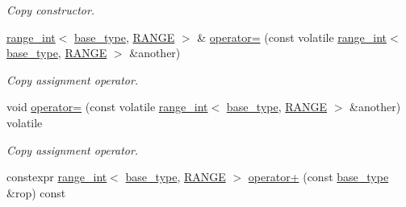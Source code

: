\begin{DoxyCompactItemize}
\begin{DoxyCompactList}\small\item\em Copy constructor. \end{DoxyCompactList}\item 
\mbox{\label{classfsl_1_1ver1__0_1_1lg_1_1range__int_a07af1a994af51c39c425520c536b89ad}} 
\mbox{\hyperlink{classfsl_1_1ver1__0_1_1lg_1_1range__int}{range\+\_\+int}}$<$ \mbox{\hyperlink{classfsl_1_1ver1__0_1_1lg_1_1range__int_af14c814b65a761cd387e7577eb2ef78c}{base\+\_\+type}}, \mbox{\hyperlink{classfsl_1_1ver1__0_1_1lg_1_1range__int_a48e6f92039600251a43bd027a8a5aa10}{R\+A\+N\+GE}} $>$ \& \mbox{\hyperlink{classfsl_1_1ver1__0_1_1lg_1_1range__int_a07af1a994af51c39c425520c536b89ad}{operator=}} (const volatile \mbox{\hyperlink{classfsl_1_1ver1__0_1_1lg_1_1range__int}{range\+\_\+int}}$<$ \mbox{\hyperlink{classfsl_1_1ver1__0_1_1lg_1_1range__int_af14c814b65a761cd387e7577eb2ef78c}{base\+\_\+type}}, \mbox{\hyperlink{classfsl_1_1ver1__0_1_1lg_1_1range__int_a48e6f92039600251a43bd027a8a5aa10}{R\+A\+N\+GE}} $>$ \&another)
\begin{DoxyCompactList}\small\item\em Copy assignment operator. \end{DoxyCompactList}\item 
\mbox{\label{classfsl_1_1ver1__0_1_1lg_1_1range__int_a9bc0baae455b6337630bbc9aeae7faa4}} 
void \mbox{\hyperlink{classfsl_1_1ver1__0_1_1lg_1_1range__int_a9bc0baae455b6337630bbc9aeae7faa4}{operator=}} (const volatile \mbox{\hyperlink{classfsl_1_1ver1__0_1_1lg_1_1range__int}{range\+\_\+int}}$<$ \mbox{\hyperlink{classfsl_1_1ver1__0_1_1lg_1_1range__int_af14c814b65a761cd387e7577eb2ef78c}{base\+\_\+type}}, \mbox{\hyperlink{classfsl_1_1ver1__0_1_1lg_1_1range__int_a48e6f92039600251a43bd027a8a5aa10}{R\+A\+N\+GE}} $>$ \&another) volatile
\begin{DoxyCompactList}\small\item\em Copy assignment operator. \end{DoxyCompactList}\item 
\mbox{\label{classfsl_1_1ver1__0_1_1lg_1_1range__int_aa2c1e9553dae1b9858d307b6faaee489}} 
constexpr \mbox{\hyperlink{classfsl_1_1ver1__0_1_1lg_1_1range__int}{range\+\_\+int}}$<$ \mbox{\hyperlink{classfsl_1_1ver1__0_1_1lg_1_1range__int_af14c814b65a761cd387e7577eb2ef78c}{base\+\_\+type}}, \mbox{\hyperlink{classfsl_1_1ver1__0_1_1lg_1_1range__int_a48e6f92039600251a43bd027a8a5aa10}{R\+A\+N\+GE}} $>$ \mbox{\hyperlink{classfsl_1_1ver1__0_1_1lg_1_1range__int_aa2c1e9553dae1b9858d307b6faaee489}{operator+}} (const \mbox{\hyperlink{classfsl_1_1ver1__0_1_1lg_1_1range__int_af14c814b65a761cd387e7577eb2ef78c}{base\+\_\+type}} \&rop) const

\end{DoxyCompactItemize}

